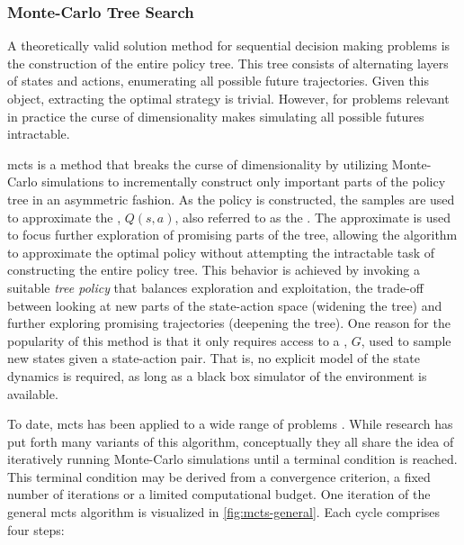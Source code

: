 \subsubsection{Monte-Carlo Tree Search}
A theoretically valid solution method for sequential decision making problems
is the construction of the entire policy tree. This tree consists of alternating
layers of states and actions, enumerating all possible future trajectories.
Given this object, extracting the optimal strategy is trivial. However, for
problems relevant in practice the curse of dimensionality makes simulating all
possible futures intractable.

\acf{mcts} is a method that breaks the curse of dimensionality by utilizing
Monte-Carlo simulations to incrementally construct only important parts of the
policy tree in an asymmetric fashion. As the policy is constructed, the samples
are used to approximate the , $Q(s, a)$,
also referred to as the \vname{\qfunction}. The approximate \qfunction is used
to focus further exploration of promising parts of the tree, allowing the
algorithm to approximate the optimal policy without attempting the intractable
task of constructing the entire policy tree. This behavior is achieved by
invoking a suitable \emph{tree policy} that balances exploration and
exploitation, the trade-off between looking at new parts of the state-action
space (widening the tree) and further exploring promising trajectories
(deepening the tree). One reason for the popularity of this method is that
it only requires access to a , $G$, used to sample new states
given a state-action pair. That is, no explicit model of the state dynamics is
required, as long as a black box simulator of the environment is available.

To date, \ac{mcts} has been applied to a wide range of problems
\cite{browne2012survey}. While research has put forth many variants of this
algorithm, conceptually they all share the idea of iteratively running
Monte-Carlo simulations until a terminal condition is reached. This terminal
condition may be derived from a convergence criterion, a fixed number of
iterations or a limited computational budget. One iteration of the general
\ac{mcts} algorithm is visualized in \cref{fig:mcts-general}. Each cycle
comprises four steps:


